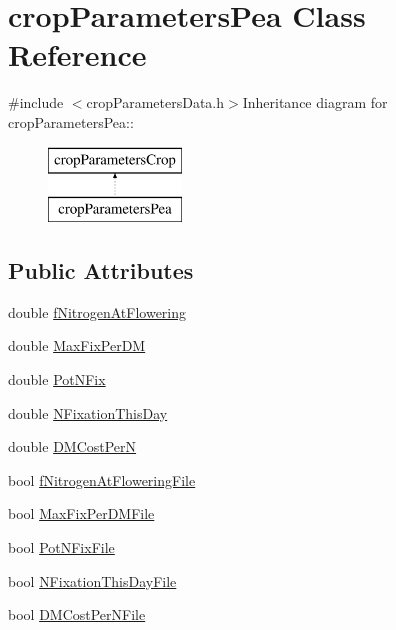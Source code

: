 \hypertarget{classcrop_parameters_pea}{
\section{cropParametersPea Class Reference}
\label{classcrop_parameters_pea}
}


{\ttfamily \#include $<$cropParametersData.h$>$}Inheritance diagram for cropParametersPea::\begin{figure}[H]
\begin{center}
\leavevmode
\includegraphics[height=2cm]{classcrop_parameters_pea}
\end{center}
\end{figure}
\subsection*{Public Attributes}
\begin{DoxyCompactItemize}
\item 
double \hyperlink{classcrop_parameters_pea_a999b4a373fa436b494bac0e71ffc6dbc}{fNitrogenAtFlowering}
\item 
double \hyperlink{classcrop_parameters_pea_ac9c83b3f12c1de96b8093bdd2549e30c}{MaxFixPerDM}
\item 
double \hyperlink{classcrop_parameters_pea_a0707df054eba7b3a7619c9e25f10244c}{PotNFix}
\item 
double \hyperlink{classcrop_parameters_pea_aae414e6045b219e8cf2b82f0ccbc02b1}{NFixationThisDay}
\item 
double \hyperlink{classcrop_parameters_pea_a672aa866e5e83329bf1d7043eeb959cd}{DMCostPerN}
\item 
bool \hyperlink{classcrop_parameters_pea_adc17adea05fb284c84074d6596362b88}{fNitrogenAtFloweringFile}
\item 
bool \hyperlink{classcrop_parameters_pea_a3da0138ad9c2d5717bce0a420e52c39a}{MaxFixPerDMFile}
\item 
bool \hyperlink{classcrop_parameters_pea_abb98059ba682d3169c60d2fc87d66364}{PotNFixFile}
\item 
bool \hyperlink{classcrop_parameters_pea_aa7e186245ac13fffb3574227d16b5e5e}{NFixationThisDayFile}
\item 
bool \hyperlink{classcrop_parameters_pea_a9c85f8f0711af306a638f8fb81bb94a8}{DMCostPerNFile}
\end{DoxyCompactItemize}



